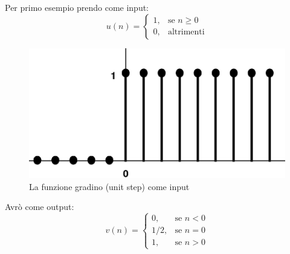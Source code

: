 Per primo esempio prendo come input:
\begin{equation*}
u(n)=
\begin{cases} 
	1, & \mbox{se }n\geq 0 \\ 
	0, & \mbox{altrimenti}
\end{cases} 
\end{equation*}

\begin{figure}[h]
	\centering
	\includegraphics[scale=0.5]{immagini/gradino}
	\caption{ La funzione gradino (unit step) come input }
	\label{fig: Unit step}
\end{figure}

\pagebreak

Avrò come output:
\begin{equation*}
v(n)=
\begin{cases} 
0, & \mbox{se }n < 0 \\ 
1/2, & \mbox{se }n = 0 \\ 
1, & \mbox{se }n > 0
\end{cases} 
\end{equation*}

